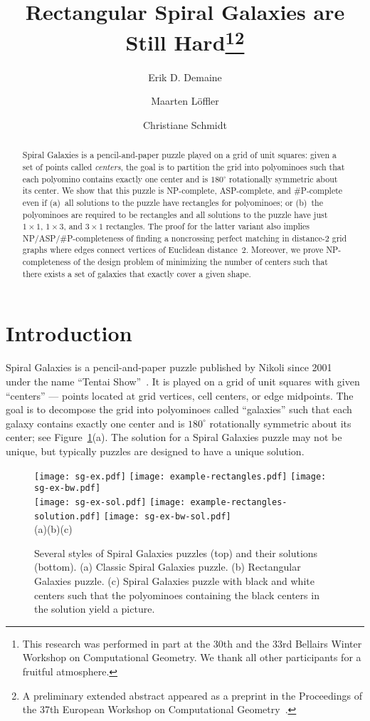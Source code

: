 \documentclass{elsarticle}
\title{Rectangular Spiral Galaxies are Still Hard\footnote{This research was performed in part at the 30th and the 33rd Bellairs Winter Workshop
on Computational Geometry. We thank all other participants for a fruitful
atmosphere.}\hspace*{.05cm}\footnote{A preliminary extended abstract appeared as a preprint in the Proceedings of the 37th European Workshop on Computational Geometry~\cite{dls-rsgsh-21}.}}
\author{Erik D. Demaine}
\author{Maarten L{\"o}ffler}
\author{Christiane Schmidt}
\begin{document}
\begin{abstract}
Spiral Galaxies is a pencil-and-paper puzzle played on a grid of unit squares: given a set of points called \emph{centers}, the goal is to partition the grid into polyominoes such that each polyomino contains exactly one center and is $180^\circ$ rotationally symmetric about its center.
We show that this puzzle is NP-complete, ASP-complete, and \#P-complete even if
(a)~all solutions to the puzzle have rectangles for polyominoes; or
(b)~the polyominoes are required to be rectangles and
all solutions to the puzzle have just
$1\times1$, $1\times3$, and $3\times1$ rectangles.
The proof for the latter variant also implies NP/ASP/\#P-completeness of finding a noncrossing perfect matching in distance-$2$ grid graphs where edges connect vertices of Euclidean distance~$2$.
Moreover, we prove NP-completeness of the design problem of minimizing the number of centers such that there exists a set of galaxies that exactly cover a given shape.
\end{abstract}

\maketitle

\section{Introduction}\label{sec:introduction}





Spiral Galaxies is a pencil-and-paper puzzle published by Nikoli since 2001~\cite{n-sg-01} under the name ``Tentai Show''~\cite{gsp-18}. It is played on a grid of unit squares with given ``centers'' --- points located at grid vertices, cell centers, or edge midpoints. The goal is to decompose the grid into polyominoes called ``galaxies'' such that each galaxy contains exactly one center and is $180^\circ$ rotationally symmetric about its center; see Figure~\ref{fig:sg-ex}(a). The solution for a Spiral Galaxies puzzle may not be unique, but typically puzzles are designed to have a unique solution.

\begin{figure}[h]
\centering
\texttt{[image: sg-ex.pdf]}
\hfill
\texttt{[image: example-rectangles.pdf]}
\hfill
\texttt{[image: sg-ex-bw.pdf]}\\\bigskip
\texttt{[image: sg-ex-sol.pdf]}
\hfill
\texttt{[image: example-rectangles-solution.pdf]}
\hfill
\texttt{[image: sg-ex-bw-sol.pdf]}\\
\mbox{}\hfill(a)\hfill\mbox{}\hfill(b)\hfill\mbox{}\hfill(c)\hfill\mbox{}
  \caption
  { \small Several styles of Spiral Galaxies puzzles (top) and their solutions (bottom).
    (a) Classic Spiral Galaxies puzzle.
    (b) Rectangular Galaxies puzzle.
    (c) Spiral Galaxies puzzle with black and white centers such that the polyominoes containing the black centers in the solution yield a picture.
  }
  \label{fig:sg-ex}
\end{figure}
\end{document}
